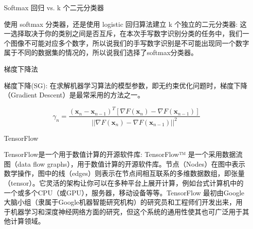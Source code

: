 \documentclass[newPxFont,sthlmFooter]{beamer}
\begin{document}
\begin{frame}[c]{Softmax 回归 vs. k 个二元分类器}

\begin{block}{使用 softmax 分类器，还是使用 logistic 回归算法建立 k 个独立的二元分类器:}
	这一选择取决于你的类别之间是否互斥，在本次手写数字识别分类的任务中，我们一个图像不可能对应多个数字，所以说我们的手写数字识别是不可能出现同一个数字属于不同的数据集的情况的，所以说我们选择了softmax分类器。
\end{block}

\end{frame}

\begin{frame}[c]{梯度下降法}

\begin{block}{梯度下降(SG):}
	在求解机器学习算法的模型参数，即无约束优化问题时，梯度下降（Gradient Descent）是最常采用的方法之一。
\end{block}

\[\gamma_{n} = \frac{(\mathbf x_{n} - \mathbf x_{n-1})^T[\nabla F(\mathbf x_{n}) - \nabla F(\mathbf x_{n-1})]}{||\nabla F(\mathbf x_{n}) - \nabla F(\mathbf x_{n-1})||^2}\]

\end{frame}

\begin{frame}[c]{TensorFlow}

\begin{block}{TensorFlow是一个用于数值计算的开源软件库:}
TensorFlow™ 是一个采用数据流图（data flow graphs），用于数值计算的开源软件库。节点（Nodes）在图中表示数学操作，图中的线（edges）则表示在节点间相互联系的多维数据数组，即张量（tensor）。它灵活的架构让你可以在多种平台上展开计算，例如台式计算机中的一个或多个CPU（或GPU），服务器，移动设备等等。TensorFlow 最初由Google大脑小组（隶属于Google机器智能研究机构）的研究员和工程师们开发出来，用于机器学习和深度神经网络方面的研究，但这个系统的通用性使其也可广泛用于其他计算领域。
\end{block}

\end{frame}
\end{document}
